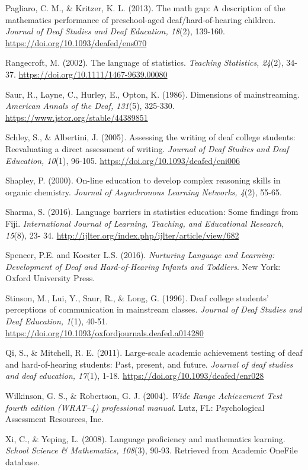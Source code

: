 \documentclass[11.5pt]{sig-alternate} %
\begin{document}
Pagliaro, C. M., \& Kritzer, K. L. (2013). The math gap: A description of the mathematics performance of preschool-aged deaf/hard-of-hearing children. \textit{Journal of Deaf Studies and Deaf Education, 18}(2), 139-160. \url{https://doi.org/10.1093/deafed/ens070} 

Rangecroft, M. (2002). The language of statistics. \textit{Teaching Statistics, 24}(2), 34-37. \url{https://doi.org/10.1111/1467-9639.00080} 

Saur, R., Layne, C., Hurley, E., Opton, K. (1986). Dimensions of mainstreaming. \textit{American Annals of the Deaf, 131}(5), 325-330. \url{https://www.jstor.org/stable/44389851}

Schley, S., \& Albertini, J. (2005). Assessing the writing of deaf college students: Reevaluating a direct assessment of writing. \textit{Journal of Deaf Studies and Deaf Education, 10}(1), 96-105. \url{https://doi.org/10.1093/deafed/eni006} 

Shapley, P. (2000). On-line education to develop complex reasoning skills in organic chemistry. \textit{Journal of Asynchronous Learning Networks, 4}(2), 55-65.

Sharma, S. (2016). Language barriers in statistics education: Some findings from Fiji. \textit{International Journal of Learning, Teaching, and Educational Research, 15}(8), 23- 34. \url{http://ijlter.org/index.php/ijlter/article/view/682}

Spencer, P.E. and Koester L.S. (2016). \textit{Nurturing Language and Learning: Development of Deaf and Hard-of-Hearing Infants and Toddlers}. New York: Oxford University Press.

Stinson, M., Lui, Y., Saur, R., \& Long, G. (1996). Deaf college students’ perceptions of communication in mainstream classes. \textit{Journal of Deaf Studies and Deaf Education, 1}(1), 40-51. \url{https://doi.org/10.1093/oxfordjournals.deafed.a014280} 

Qi, S., \& Mitchell, R. E. (2011). Large-scale academic achievement testing of deaf and hard-of-hearing students: Past, present, and future. \textit{Journal of deaf studies and deaf education, 17}(1), 1-18. \url{https://doi.org/10.1093/deafed/enr028}

Wilkinson, G. S., \& Robertson, G. J. (2004). \textit{Wide Range Achievement Test fourth edition (WRAT–4) professional manual}. Lutz, FL: Psychological Assessment Resources, Inc.

Xi, C., \& Yeping, L. (2008). Language proficiency and mathematics learning. \textit{School Science \& Mathematics, 108}(3), 90-93. Retrieved from Academic OneFile database.
\end{document}
